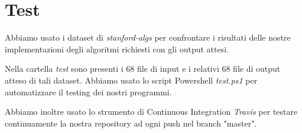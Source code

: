 \section{Test}
\label{cap:tests}

Abbiamo usato i dataset di \textit{stanford-algs} per confrontare i risultati delle nostre implementazioni degli algoritmi richiesti con gli output attesi.

\noindent Nella cartella \textit{test} sono presenti i 68 file di input e i relativi 68 file di output atteso di tali dataset. Abbiamo usato lo script Powershell \textit{test.ps1} per automatizzare il testing dei nostri programmi.

\noindent Abbiamo inoltre usato lo strumento di Continuous Integration \textit{Travis} per testare continuamente la nostra repository ad ogni push nel branch "master".
